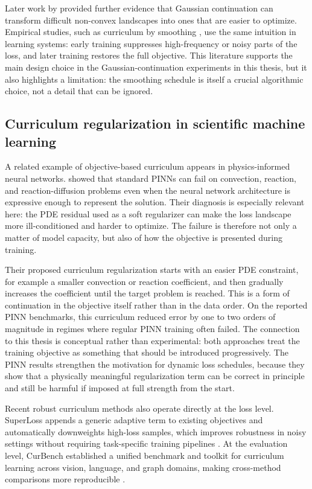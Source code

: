 \documentclass[english,master,a4paper,oneside]{ppfcmthesis}
\begin{document}
Later work by \citet{ilersich2025deep} provided further evidence
that Gaussian continuation can transform difficult non-convex landscapes into
ones that are easier to optimize. Empirical studies, such as curriculum by
smoothing \citep{sinha2020curriculum}, use the same intuition in learning
systems: early training suppresses high-frequency or noisy parts of the loss,
and later training restores the full objective. This literature supports the
main design choice in the Gaussian-continuation experiments in this thesis, but
it also highlights a limitation: the smoothing schedule is itself a crucial
algorithmic choice, not a detail that can be ignored.

\subsection{Curriculum regularization in scientific machine learning}
A related example of objective-based curriculum appears in physics-informed
neural networks. \citet{krishnapriyan2021characterizing} showed that standard PINNs can fail on convection, reaction, and
reaction-diffusion problems even when the neural network architecture is
expressive enough to represent the solution. Their diagnosis is especially
relevant here: the PDE residual used as a soft regularizer can make the loss
landscape more ill-conditioned and harder to optimize. The failure is therefore
not only a matter of model capacity, but also of how the objective is presented
during training.

Their proposed curriculum regularization starts with an easier PDE constraint,
for example a smaller convection or reaction coefficient, and then gradually
increases the coefficient until the target problem is reached. This is a form of
continuation in the objective itself rather than in the data order. On the
reported PINN benchmarks, this curriculum reduced error by one to two orders of
magnitude in regimes where regular PINN training often failed. The connection to
this thesis is conceptual rather than experimental: both approaches treat the
training objective as something that should be introduced progressively. The PINN
results strengthen the motivation for dynamic loss schedules, because they show
that a physically meaningful regularization term can be correct in principle and
still be harmful if imposed at full strength from the start.

Recent robust curriculum methods also operate directly at the loss level.
SuperLoss appends a generic adaptive term to existing objectives and
automatically downweights high-loss samples, which improves robustness in noisy
settings without requiring task-specific training pipelines
\citep{castells2020superloss}. At the evaluation level, CurBench established a
unified benchmark and toolkit for curriculum learning across vision, language,
and graph domains, making cross-method comparisons more reproducible
\citep{zhou2024curbench}.
\end{document}
